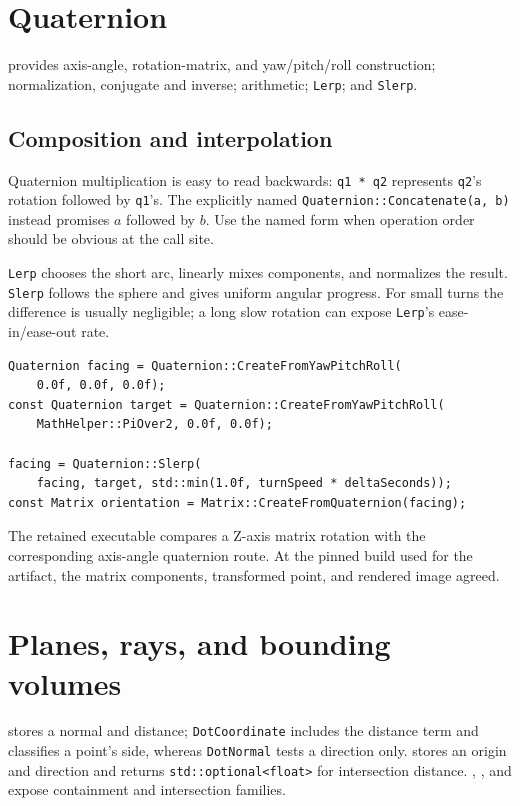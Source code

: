 \section{Quaternion}

 provides axis-angle, rotation-matrix, and yaw/pitch/roll construction;
normalization, conjugate and inverse; arithmetic; \texttt{Lerp}; and \texttt{Slerp}.

\subsection{Composition and interpolation}
\label{sec:quaternion-full-reference}

Quaternion multiplication is easy to read backwards: \texttt{q1 * q2} represents
\texttt{q2}'s rotation followed by \texttt{q1}'s. The explicitly named
\texttt{Quaternion::Concatenate(a, b)} instead promises $a$ followed by $b$. Use the named form
when operation order should be obvious at the call site.

\texttt{Lerp} chooses the short arc, linearly mixes components, and normalizes the result.
\texttt{Slerp} follows the sphere and gives uniform angular progress. For small turns the
difference is usually negligible; a long slow rotation can expose \texttt{Lerp}'s ease-in/ease-out
rate.

\begin{lstlisting}
Quaternion facing = Quaternion::CreateFromYawPitchRoll(
    0.0f, 0.0f, 0.0f);
const Quaternion target = Quaternion::CreateFromYawPitchRoll(
    MathHelper::PiOver2, 0.0f, 0.0f);

facing = Quaternion::Slerp(
    facing, target, std::min(1.0f, turnSpeed * deltaSeconds));
const Matrix orientation = Matrix::CreateFromQuaternion(facing);
\end{lstlisting}

The retained executable
 compares a Z-axis matrix
rotation with the corresponding axis-angle quaternion route. At the pinned build used for the
artifact, the matrix components, transformed point, and rendered image agreed.

\section{Planes, rays, and bounding volumes}
\label{sec:bounding-volumes}

 stores a normal and distance; \texttt{DotCoordinate} includes the distance term
and classifies a point's side, whereas \texttt{DotNormal} tests a direction only.
 stores an origin and direction and returns \texttt{std::optional<float>} for
intersection distance. , , and
 expose containment and intersection families.

